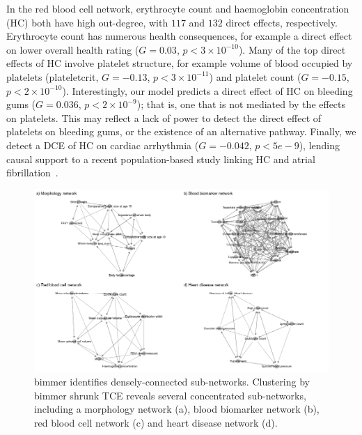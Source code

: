 \documentclass{article}
\begin{document}
In the red blood cell network, erythrocyte count and haemoglobin concentration (HC)
both have high out-degree, with $117$ and $132$ direct effects, respectively.
Erythrocyte count has numerous health consequences,
for example a direct effect on lower overall health rating ($G = 0.03$, $p < 3 \times 10^{-10}$).
Many of the top direct effects of HC involve platelet structure,
for example volume of blood occupied by platelets (plateletcrit, $G = -0.13$, $p < 3 \times 10^{-11}$)
and platelet count
($G = -0.15$, $p < 2 \times 10^{-10}$). Interestingly, our model predicts a direct effect of
HC on bleeding gums ($G = 0.036$, $p < 2 \times 10^{-9}$); that is, one
that is not mediated by the effects on platelets. This may reflect a lack of power to detect
the direct effect of platelets on bleeding gums, or the existence of an alternative pathway.
Finally, we detect a DCE of HC on cardiac arrhythmia ($G = -0.042$, $p < 5e-9$), lending causal
support to a recent population-based study linking HC and atrial fibrillation~\cite{Lim2020}.

\begin{figure}
\includegraphics[width=\textwidth]{figures/figure5b.png}
\caption{bimmer identifies densely-connected sub-networks.
Clustering by bimmer shrunk TCE reveals
several concentrated sub-networks, including a morphology network (a), blood biomarker
network (b), red blood cell network (c) and heart disease network (d).}
\label{figure5b}
\end{figure}
\end{document}

